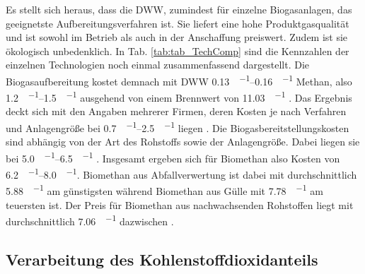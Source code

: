 Es stellt sich heraus, dass die \gls{DWW}, zumindest für einzelne Biogasanlagen, das geeignetste Aufbereitungsverfahren ist. Sie liefert eine hohe Produktgasqualität und ist sowohl im Betrieb als auch in der Anschaffung preiswert. Zudem ist sie ökologisch unbedenklich. In Tab. \ref{tab:tab_TechComp} sind die Kennzahlen der einzelnen Technologien noch einmal zusammenfassend dargestellt. Die Biogasaufbereitung kostet demnach mit \gls{DWW} \SIrange{0,13}{0,16}{\sieuro\per\normvol} Methan, also \SIrange{1,2}{1,5}{\ct\per\kwh} ausgehend von einem Brennwert von \SI{11,03}{\kwh\per\normvol} \parencite{meier14}. Das Ergebnis deckt sich mit den Angaben mehrerer Firmen, deren Kosten je nach Verfahren und Anlagengröße bei \SIrange{0,7}{2,5}{\ct\per\kwh} liegen \parencite{FNR14}. Die Biogasbereitstellungskosten sind abhängig von der Art des Rohstoffs sowie der Anlagengröße. Dabei liegen sie bei \SIrange{5,0}{6,5}{\ct\per\kwh} \parencite{FNR14}. Insgesamt ergeben sich für Biomethan also Kosten von \SIrange{6,2}{8,0}{\ct\per\kwh}. Biomethan aus Abfallverwertung ist dabei mit durchschnittlich \SI{5,88}{\ct\per\kwh} am günstigsten während Biomethan aus Gülle mit \SI{7,78}{\ct\per\kwh} am teuersten ist. Der Preis für Biomethan aus nachwachsenden Rohstoffen liegt mit durchschnittlich \SI{7,06}{\ct\per\kwh} dazwischen \parencite{dena19}.




\subsection{Verarbeitung des Kohlenstoffdioxidanteils}

